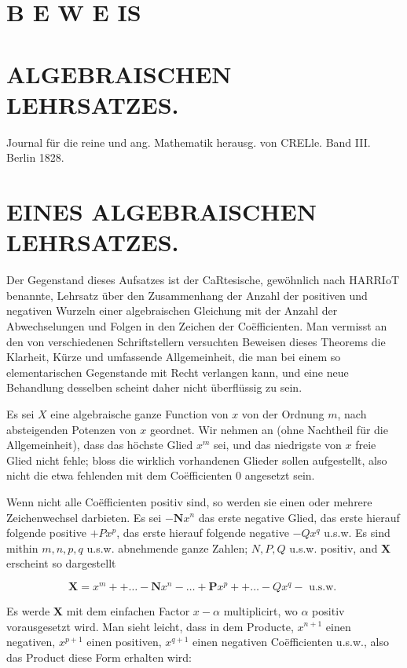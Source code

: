 \documentclass[twoside,12pt, showframe]{memoir}
\begin{document}
\section*{B E W E IS }


\section*{ALGEBRAISCHEN LEHRSATZES.}
Journal für die reine und ang. Mathematik herausg. von CRELle. Band III. Berlin 1828.

\section*{EINES ALGEBRAISCHEN LEHRSATZES.}
Der Gegenstand dieses Aufsatzes ist der CaRtesische, gewöhnlich nach HARRIoT benannte, Lehrsatz über den Zusammenhang der Anzahl der positiven und negativen Wurzeln einer algebraischen Gleichung mit der Anzahl der Abwechselungen und Folgen in den Zeichen der Coëfficienten. Man vermisst an den von verschiedenen Schriftstellern versuchten Beweisen dieses Theorems die Klarheit, Kürze und umfassende Allgemeinheit, die man bei einem so elementarischen Gegenstande mit Recht verlangen kann, und eine neue Behandlung desselben scheint daher nicht überflüssig zu sein.

Es sei \(X\) eine algebraische ganze Function von \(x\) von der Ordnung \(m\), nach absteigenden Potenzen von \(x\) geordnet. Wir nehmen an (ohne Nachtheil für die Allgemeinheit), dass das höchste Glied \(x^{m}\) sei, und das niedrigste von \(x\) freie Glied nicht fehle; bloss die wirklich vorhandenen Glieder sollen aufgestellt, also nicht die etwa fehlenden mit dem Coëfficienten 0 angesetzt sein.

Wenn nicht alle Coëfficienten positiv sind, so werden sie einen oder mehrere Zeichenwechsel darbieten. Es sei \(-\boldsymbol{N} x^{n}\) das erste negative Glied, das erste hierauf folgende positive \(+P x^{p}\), das erste hierauf folgende negative \(-Q x^{q}\) u.s.w. Es sind mithin \(m, n, p, q\) u.s.w. abnehmende ganze Zahlen; \(N, P, Q\) u.s.w. positiv, and \(\mathbf{X}\) erscheint so dargestellt

\[
\mathbf{X}=x^{m}++\ldots-\boldsymbol{N} x^{n}-\ldots+\boldsymbol{P} x^{p}++\ldots-Q x^{q}-\text { u.s.w. }
\]

Es werde \(\boldsymbol{X}\) mit dem einfachen Factor \(x-\alpha\) multiplicirt, wo \(\alpha\) positiv vorausgesetzt wird. Man sieht leicht, dass in dem Producte, \(x^{n+1}\) einen negativen, \(x^{p+1}\) einen positiven, \(x^{q+1}\) einen negativen Coëfficienten u.s.w., also das Product diese Form erhalten wird:
\end{document}
